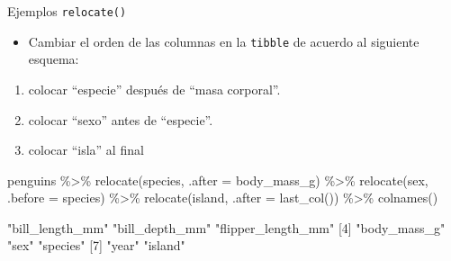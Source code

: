 \documentclass[
  ignorenonframetext,
  aspectratio=169]{beamer}
\newenvironment{Shaded}{\begin{snugshade}}{\end{snugshade}}
\newcommand{\AttributeTok}[1]{\textcolor[rgb]{0.77,0.63,0.00}{#1}}
\newcommand{\FunctionTok}[1]{\textcolor[rgb]{0.00,0.00,0.00}{#1}}
\newcommand{\NormalTok}[1]{#1}
\newcommand{\SpecialCharTok}[1]{\textcolor[rgb]{0.00,0.00,0.00}{#1}}
\providecommand{\tightlist}{%
  \setlength{\itemsep}{0pt}\setlength{\parskip}{0pt}}
\let\oldverbatim\verbatim
\let\endoldverbatim\endverbatim
\renewenvironment{verbatim}{\tiny\oldverbatim}{\endoldverbatim}
\begin{document}
\begin{frame}[fragile]{Ejemplos \texttt{relocate()}}
\protect\hypertarget{ejemplos-relocate}{}
\begin{itemize}
\tightlist
\item
  Cambiar el orden de las columnas en la \texttt{tibble} de acuerdo al
  siguiente esquema:
\end{itemize}

\begin{enumerate}
\tightlist
\item
  colocar ``especie'' después de ``masa corporal''.
\item
  colocar ``sexo'' antes de ``especie''.
\item
  colocar ``isla'' al final
\end{enumerate}

\begin{Shaded}
\begin{Highlighting}[]
\NormalTok{penguins }\SpecialCharTok{\%\textgreater{}\%} 
  \FunctionTok{relocate}\NormalTok{(species, }\AttributeTok{.after =}\NormalTok{ body\_mass\_g) }\SpecialCharTok{\%\textgreater{}\%}
  \FunctionTok{relocate}\NormalTok{(sex, }\AttributeTok{.before =}\NormalTok{ species) }\SpecialCharTok{\%\textgreater{}\%}
  \FunctionTok{relocate}\NormalTok{(island, }\AttributeTok{.after =} \FunctionTok{last\_col}\NormalTok{()) }\SpecialCharTok{\%\textgreater{}\%}
  \FunctionTok{colnames}\NormalTok{()}
\end{Highlighting}
\end{Shaded}

\begin{verbatim}
[1] "bill_length_mm"    "bill_depth_mm"     "flipper_length_mm"
[4] "body_mass_g"       "sex"               "species"          
[7] "year"              "island"           
\end{verbatim}
\end{frame}
\end{document}
